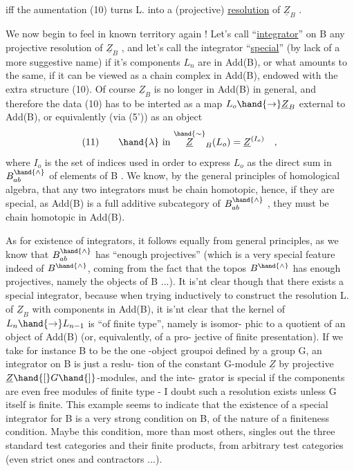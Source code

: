 iff the aumentation (10) turns L. into a (projective) \uline{resolution} of $\underline{Z}_B$ .

We now begin to feel in known territory again ! Let's call 
``\uline{integrator}'' on B any projective resolution of $\underline{Z}_B$ , and let's call the
integrator ``\uline{special}'' (by lack of a more suggestive name) if it's components
$L_n$ are in Add(B), or what amounts to the same, if it can be viewed as a
chain complex in Add(B), endowed with the extra structure (10). 
Of course $\underline{Z}_B$ is no longer in Add(B) in general, and therefore the data
(10) has to be interted as a map $L_o \hand{\to} \underline{Z}_B$ external to Add(B), or
equivalently (via (5')) as an object 
\[ (11) \qquad \hand{\lambda} \text{ in } \overset{\hand{\sim}}{\underline{Z}}_B(L_o) = \underline{Z}^{(I_o)} \quad , \]
where $I_o$ is the set of indices used in order to express $L_o$ as the direct
sum  in $B^{\hand{\wedge}}_{ab}$ of elements of B . We know, by the general principles
of homological algebra, that any two integrators must be chain homotopic,
hence, if they are special, as Add(B) is a full additive subcategory of
$B^{\hand{\wedge}}_{ab}$ , they must be chain homotopic in Add(B).

As for existence of integrators, it follows equally from general
principles, as we know that $B^{\hand{\wedge}}_{ab}$ has ``enough projectives'' (which is a very
special feature indeed of $B^{\hand{\wedge}}$, coming from the fact that the topos $B^{\hand{\wedge}}$ has
enough projectives, namely the objects of B ...). It is'nt clear though
that there exists a special integrator, because when trying inductively
to construct the resolution L. of $\underline{Z}_B$ with components in Add(B), it is'nt
clear that the kernel of $L_n \hand{\to} L_{n-1}$ is ``of finite type'', namely is isomor-%
phic to a quotient of an object of Add(B) (or, equivalently,  of a pro-%
jective of finite presentation). If we take for instance B to be the one%
-object groupoi defined by a group G, an integrator on B is just a reslu-%
tion of the constant G-module $\underline{Z}$ by projective $\underline{Z}\hand{[}G\hand{]}$-modules, and the inte-%
grator is special if the components are even free modules of finite type -
 I doubt such a resolution exists unless G itself is finite. This example
seems to indicate that the existence of a special integrator for B is a
very strong condition on B, of the nature of a  finiteness condition.
Maybe this condition, more than most others, singles out the three
standard test categories and their finite products, from arbitrary 
test categories (even strict ones and contractors ...).

